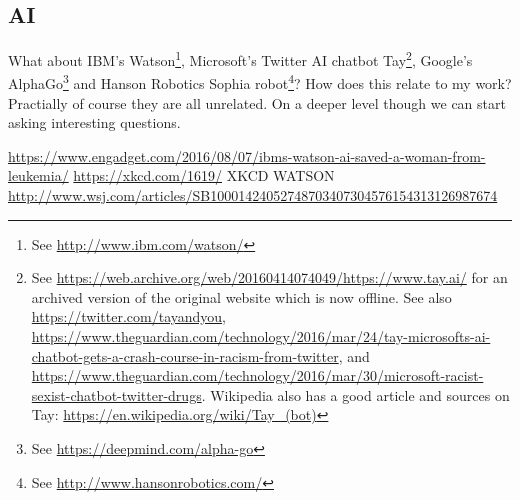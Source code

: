 \documentclass[11pt]{thesis} %
\begin{document}
\subsection{AI}



What about IBM's Watson\footnote{See \url{http://www.ibm.com/watson/}}, Microsoft's Twitter \ac{AI} chatbot Tay\footnote{See \url{https://web.archive.org/web/20160414074049/https://www.tay.ai/} for an archived version of the original website which is now offline. See also \url{https://twitter.com/tayandyou}, \url{https://www.theguardian.com/technology/2016/mar/24/tay-microsofts-ai-chatbot-gets-a-crash-course-in-racism-from-twitter}, and \url{https://www.theguardian.com/technology/2016/mar/30/microsoft-racist-sexist-chatbot-twitter-drugs}. Wikipedia also has a good article and sources on Tay: \url{https://en.wikipedia.org/wiki/Tay_(bot)}}, Google's AlphaGo\footnote{See \url{https://deepmind.com/alpha-go}} and Hanson Robotics Sophia robot\footnote{See \url{http://www.hansonrobotics.com/}}? How does this relate to my work? Practially of course they are all unrelated. On a deeper level though we can start asking interesting questions. 

\url{https://www.engadget.com/2016/08/07/ibms-watson-ai-saved-a-woman-from-leukemia/}
\url{https://xkcd.com/1619/} XKCD WATSON
\url{http://www.wsj.com/articles/SB10001424052748703407304576154313126987674}
\end{document}
